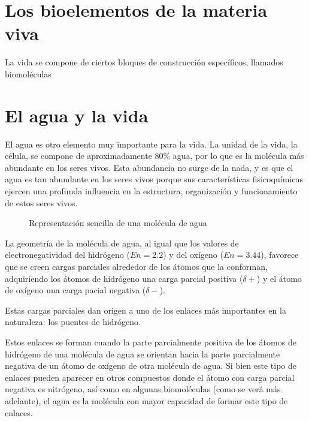 \section{Los bioelementos de la materia viva}

La vida se compone de ciertos bloques de construcción específicos, llamados biomoléculas

\section{El agua y la vida}

El agua es otro elemento muy importante para la vida. La unidad de la vida, la célula, se compone de aproximadamente 80\% agua, por lo que es la molécula más abundante en los seres vivos. Esta abundancia no surge de la nada, y es que el agua es tan abundante en los seres vivos porque sus características fisicoquímicas ejercen una profunda influencia en la estructura, organización y funcionamiento de estos seres vivos.   

\begin{figure}[H]
    \centering
    \vspace{6pt}
    \LARGE {}
    \caption{Representación sencilla de una molécula de agua}
    \label{fig:molécula_agua}
\end{figure}


La geometría de la molécula de agua, al igual que los valores de electronegatividad del hidrógeno ($En=2.2$) y del oxígeno ($En=3.44$), favorece que se creen cargas parciales alrededor de los átomos que la conforman, adquiriendo los átomos de hidrógeno una carga parcial positiva ($\delta +$) y el átomo de oxígeno una carga pacial negativa ($\delta -$).

Estas cargas parciales dan origen a uno de los enlaces más importantes en la naturaleza: los puentes de hidrógeno.

Estos enlaces se forman cuando la parte parcialmente positiva de los átomos de hidrógeno de una molécula de agua se orientan hacia la parte parcialmente negativa de un átomo de oxígeno de otra molécula de agua. Si bien este tipo de enlaces pueden aparecer en otros compuestos donde el átomo con carga parcial negativa es nitrógeno, así como en algunas biomoléculas (como se verá más adelante), el agua es la molécula con mayor capacidad de formar este tipo de enlaces.

